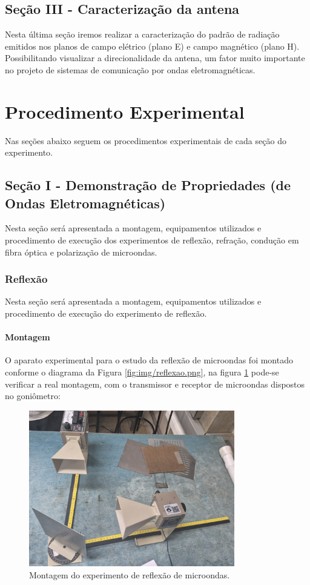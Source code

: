 \documentclass[12pt]{article}
\begin{document}
\subsection{Seção III - Caracterização da antena}
Nesta última seção iremos realizar a caracterização do padrão de
radiação emitidos nos planos de campo elétrico (plano E) e campo
magnético (plano H). Possibilitando visualizar a direcionalidade da
antena, um fator muito importante no projeto de sistemas de
comunicação por ondas eletromagnéticas.

\section{Procedimento Experimental}
Nas seções abaixo seguem os procedimentos experimentais de cada seção
do experimento.

\subsection{Seção I - Demonstração de Propriedades (de Ondas Eletromagnéticas)}
Nesta seção será apresentada a montagem, equipamentos utilizados e
procedimento de execução dos experimentos de reflexão, refração,
condução em fibra óptica e polarização de microondas.

\subsubsection{Reflexão}
Nesta seção será apresentada a montagem, equipamentos utilizados e
procedimento de execução do experimento de reflexão.

\paragraph{Montagem}
O aparato experimental para o estudo da reflexão de microondas foi
montado conforme o diagrama da Figura \ref{fig:img/reflexao.png}, na
figura \ref{fig:img/reflexaomontagem.png} pode-se
verificar a real montagem, com o transmissor e receptor de microondas
dispostos no goniômetro:

\begin{figure}[H]
  \centering
  \includegraphics[width=0.8\textwidth]{img/reflexaomontagem.png}
  \caption{Montagem do experimento de reflexão de microondas.}
  \label{fig:img/reflexaomontagem.png}
\end{figure}
\end{document}
